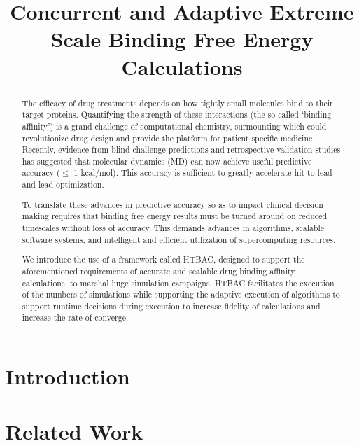 \documentclass[conference]{IEEEtran}
\title{Concurrent and Adaptive Extreme Scale Binding Free Energy
Calculations}
\author{
\IEEEauthorblockN{}
\IEEEauthorblockA{RADICAL Laboratory, Electrical and Computer Engineering,
                    Rutgers University, New Brunswick, NJ, USA}
}
\begin{document}
\maketitle

\begin{abstract}
The efficacy of drug treatments depends on how tightly small molecules bind
to their target proteins. Quantifying the strength of these interactions (the
so called ‘binding affinity’) is a grand challenge of computational
chemistry, surmounting which could revolutionize drug design and provide the
platform for patient specific medicine. Recently, evidence from blind
challenge predictions and retrospective validation studies has suggested that
molecular dynamics (MD) can now achieve useful predictive accuracy ($\leq$ 1
kcal/mol). This accuracy is sufficient to greatly accelerate hit to lead and
lead optimization.

To translate these advances in predictive accuracy so as to impact clinical
decision making requires that binding free energy results must be turned
around on reduced timescales without loss of accuracy. This demands advances
in algorithms, scalable software systems, and intelligent and efficient
utilization of supercomputing resources.

We introduce the use of a framework called HTBAC, designed to support the
aforementioned requirements of accurate and scalable drug binding affinity
calculations, to marshal huge simulation campaigns. HTBAC facilitates the
execution of the numbers of simulations while supporting the adaptive
execution of algorithms to support runtime decisions during execution to 
increase fidelity of calculations and increase the rate of converge.
\end{abstract}


\section{Introduction}
\label{sec:intro}



\section{Related Work}
\label{sec:related-work}

\end{document}
